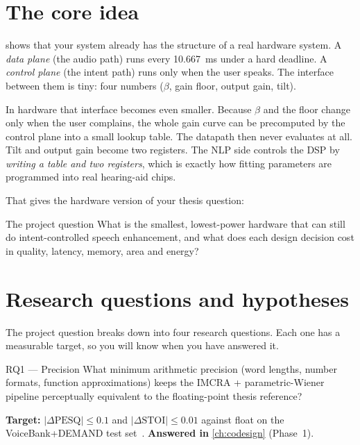 \section{The core idea}\label{sec:overview:idea}

 shows that your system already has the structure of a real
hardware system. A \emph{data plane} (the audio path) runs every
\qty{10.667}{\ms} under a hard deadline. A \emph{control plane} (the intent path)
runs only when the user speaks. The interface between them is tiny: four
numbers ($\beta$, gain floor, output gain, tilt).

In hardware that interface becomes even smaller. Because $\beta$ and the floor
change only when the user complains, the whole gain curve can be precomputed by
the control plane into a small lookup table. The datapath then never evaluates
 at all. Tilt and output gain become two registers. The NLP side
controls the DSP by \emph{writing a table and two registers}, which is exactly
how fitting parameters are programmed into real hearing-aid chips.

That gives the hardware version of your thesis question:

\begin{rqbox}{The project question}
What is the smallest, lowest-power hardware that can still do intent-controlled
speech enhancement, and what does each design decision cost in quality, latency,
memory, area and energy?
\end{rqbox}

\section{Research questions and hypotheses}\label{sec:overview:rq}

The project question breaks down into four research questions. Each one has a
measurable target, so you will know when you have answered it.

\begin{rqbox}{RQ1 --- Precision}
What minimum arithmetic precision (word lengths, number formats, function
approximations) keeps the IMCRA + parametric-Wiener pipeline perceptually
equivalent to the floating-point thesis reference?

\textbf{Target:} $|\Delta\text{PESQ}|\le0.1$ and $|\Delta\text{STOI}|\le0.01$
against float on the VoiceBank+DEMAND test set~\cite{valentini2016voicebank}.
\textbf{Answered in} \cref{ch:codesign} (Phase~1).
\end{rqbox}

